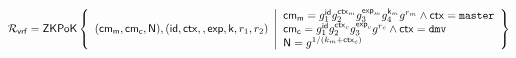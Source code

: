 \begin{enumerate}
    \[
        \mathcal{R}_{\mathsf{vrf}} = {\mathsf{ZKPoK}} \left\{ 
        \begin{array}{l} 
        (\mathsf{cm_m}, \mathsf{cm_c}, \mathsf{N}), (\mathsf{id}, \mathsf{ctx}, , \mathsf{exp}, \mathsf{k}, r_1, r_2) \\
        \end{array} 
        \middle|
        \begin{array}{l}
            \mathsf{cm_m} = g_1^{\mathsf{id}}g_2^{\mathsf{ctx}_m}g_3^{\mathsf{exp}_m}g_4^{\mathsf{k}_m}g^{r_m}  \wedge \mathsf{ctx}=\texttt{master} \\
            \mathsf{cm_c} = g_1^{\mathsf{id}}g_2^{\mathsf{ctx}_c}g_3^{\mathsf{exp}_c}g^{r_c} \wedge \mathsf{ctx}=\texttt{dmv} \\
            \mathsf{N} = g^{1/(k_m + \mathsf{ctx}_c)}
        \end{array} 
        \right\}
    \]

\end{enumerate}
